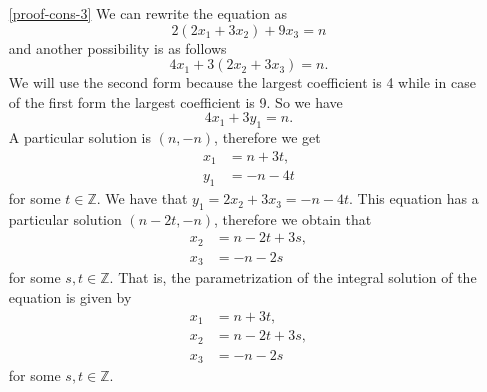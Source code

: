 \begin{enumerate}
\item[\ref{proof-cons-3}] We can rewrite the equation as 
$$
2(2x_1+3x_2)+9x_3=n
$$
and another possibility is as follows
$$
4x_1+3(2x_2+3x_3)=n.
$$
We will use the second form because the largest coefficient is 4 while in case of the first form the largest
coefficient is 9. So we have
$$
4x_1+3y_1=n.
$$
A particular solution is $(n,-n)$, therefore we get
\begin{align*}
x_1&=n+3t,\\
y_1&=-n-4t
\end{align*}
for some $t\in\mathbb{Z}$. We have that $y_1=2x_2+3x_3=-n-4t$. This equation has a particular solution
$(n-2t,-n)$, therefore we obtain that
\begin{align*}
x_2&=n-2t+3s,\\
x_3&=-n-2s
\end{align*}
for some $s,t\in\mathbb{Z}$. That is, the parametrization of the integral solution of the equation is
given by
\begin{align*}
x_1&=n+3t,\\
x_2&=n-2t+3s,\\
x_3&=-n-2s
\end{align*}
for some $s,t\in\mathbb{Z}$.


\end{enumerate}
